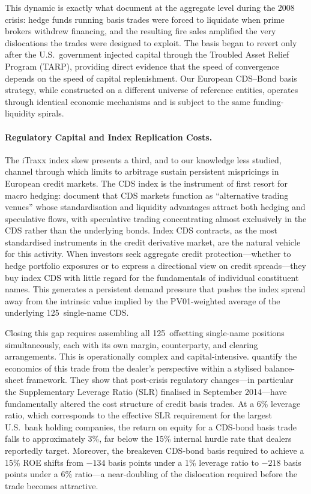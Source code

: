 This dynamic is exactly what \citet{mitchell2012arbitrage} document at the
aggregate level during the 2008 crisis: hedge funds running basis trades were
forced to liquidate when prime brokers withdrew financing, and the resulting
fire sales amplified the very dislocations the trades were designed to exploit.
The basis began to revert only after the U.S.\ government injected capital
through the Troubled Asset Relief Program (TARP), providing direct evidence
that the speed of convergence depends on the speed of capital replenishment.
Our European CDS--Bond basis strategy, while constructed on a different
universe of reference entities, operates through identical economic
mechanisms and is subject to the same funding-liquidity spirals.

\paragraph{Regulatory Capital and Index Replication Costs.}
The iTraxx index skew presents a third, and to our knowledge less studied,
channel through which limits to arbitrage sustain persistent mispricings in
European credit markets.  The CDS index is the instrument of first resort for
macro hedging: \citet{oehmke2017anatomy} document that CDS markets function
as ``alternative trading venues'' whose standardisation and liquidity advantages
attract both hedging and speculative flows, with speculative trading
concentrating almost exclusively in the CDS rather than the underlying bonds.
Index CDS contracts, as the most standardised instruments in the credit
derivative market, are the natural vehicle for this activity.  When investors
seek aggregate credit protection---whether to hedge portfolio exposures or to
express a directional view on credit spreads---they buy index CDS with little
regard for the fundamentals of individual constituent names.  This generates a
persistent demand pressure that pushes the index spread away from the intrinsic
value implied by the PV01-weighted average of the underlying 125~single-name
CDS.

Closing this gap requires assembling all 125~offsetting single-name positions
simultaneously, each with its own margin, counterparty, and clearing
arrangements.  This is operationally complex and capital-intensive.
\citet{boyarchenko2016trends} quantify the economics of this trade
from the dealer's perspective within a stylised balance-sheet framework.  They
show that post-crisis regulatory changes---in particular the Supplementary
Leverage Ratio (SLR) finalised in September 2014---have fundamentally altered
the cost structure of credit basis trades.  At a 6\% leverage ratio, which
corresponds to the effective SLR requirement for the largest U.S.\ bank
holding companies, the return on equity for a CDS-bond basis trade falls to
approximately 3\%, far below the 15\% internal hurdle rate that dealers
reportedly target.  Moreover, the breakeven CDS-bond basis required to achieve
a 15\% ROE shifts from $-134$ basis points under a 1\% leverage ratio to
$-218$ basis points under a 6\% ratio---a near-doubling of the dislocation
required before the trade becomes attractive.

